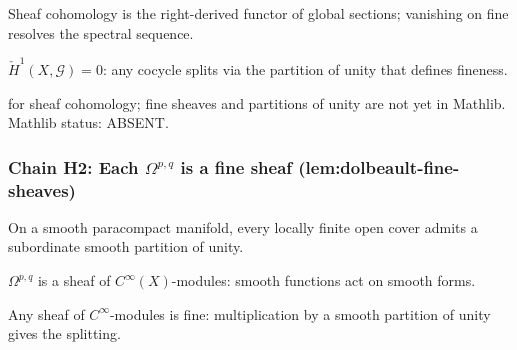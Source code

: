 \begin{lemma}
\label{lem:dfr-r3}
Sheaf cohomology is the right-derived functor of global sections; vanishing on fine resolves the spectral sequence.
\leanok
\end{lemma}

\begin{lemma}
\label{lem:dfr-r4}
$\check{H}^{1}(X,\mathcal{G}) = 0$: any cocycle splits via the partition of unity that defines fineness.
\leanok
\end{lemma}

\begin{lemma}
\label{lem:dfr-r5}
 for sheaf cohomology; fine sheaves and partitions of unity are not yet in Mathlib.  Mathlib status: ABSENT.
\leanok
\end{lemma}

\subsubsection*{Chain H2: Each $\Omega^{p,q}$ is a fine sheaf (lem:dolbeault-fine-sheaves)}

\begin{lemma}
\label{lem:dfs-r1}
On a smooth paracompact manifold, every locally finite open cover admits a subordinate smooth partition of unity.
\leanok
\end{lemma}

\begin{lemma}
\label{lem:dfs-r2}
$\Omega^{p,q}$ is a sheaf of $C^{\infty}(X)$-modules: smooth functions act on smooth forms.
\leanok
\end{lemma}

\begin{lemma}
\label{lem:dfs-r3}
Any sheaf of $C^{\infty}$-modules is fine: multiplication by a smooth partition of unity gives the splitting.
\leanok
\end{lemma}

